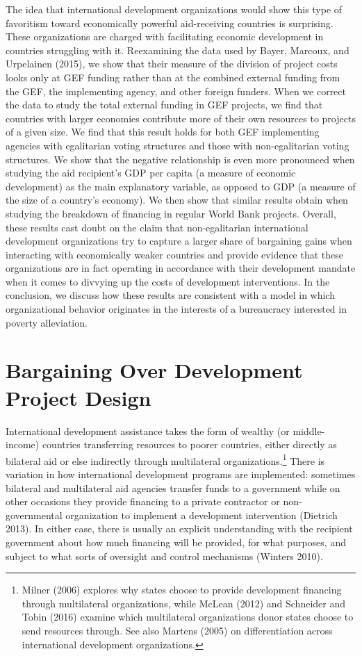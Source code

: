 \documentclass{article}
\begin{document}
The idea that international development organizations would show this type of favoritism toward economically powerful aid-receiving countries is surprising.  These organizations are charged with facilitating economic development in countries struggling with it.  Reexamining the data used by Bayer, Marcoux, and Urpelainen (2015), we show that their measure of the division of project costs looks only at GEF funding rather than at the combined external funding from the GEF, the implementing agency, and other foreign funders.  When we correct the data to study the total external funding in GEF projects, we find that countries with larger economies contribute more of their own resources to projects of a given size.  We find that this result holds for both GEF implementing agencies with egalitarian voting structures and those with non-egalitarian voting structures.  We show that the negative relationship is even more pronounced when studying the aid recipient’s GDP per capita (a measure of economic development) as the main explanatory variable, as opposed to GDP (a measure of the size of a country’s economy).  We then show that similar results obtain when studying the breakdown of financing in regular World Bank projects.  Overall, these results cast doubt on the claim that non-egalitarian international development organizations try to capture a larger share of bargaining gains when interacting with economically weaker countries and provide evidence that these organizations are in fact operating in accordance with their development mandate when it comes to divvying up the costs of development interventions.  In the conclusion, we discuss how these results are consistent with a model in which organizational behavior originates in the interests of a bureaucracy interested in poverty alleviation.



\section{Bargaining Over Development Project Design}
International development assistance takes the form of wealthy (or middle-income) countries transferring resources to poorer countries, either directly as bilateral aid or else indirectly through multilateral organizations.\footnote{Milner (2006) explores why states choose to provide development financing through multilateral organizations, while McLean (2012) and Schneider and Tobin (2016) examine which multilateral organizations donor states choose to send resources through.  See also Martens (2005) on differentiation across international development organizations.} There is variation in how international development programs are implemented: sometimes bilateral and multilateral aid agencies transfer funds to a government while on other occasions they provide financing to a private contractor or non-governmental organization to implement a development intervention (Dietrich 2013).  In either case, there is usually an explicit understanding with the recipient government about how much financing will be provided, for what purposes, and subject to what sorts of oversight and control mechanisms (Winters 2010).
\end{document}
